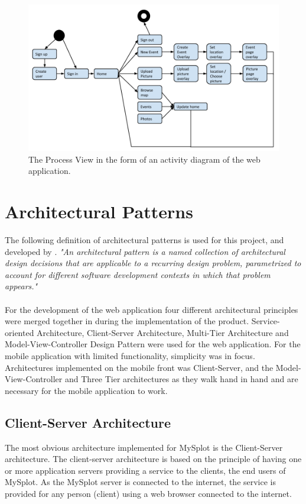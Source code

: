 \begin{figure}
\centering
\includegraphics[width=\linewidth]{./Architecture/img/ProcessView.png}
\caption{The Process View in the form of an activity diagram of the web application. \label{overflow}}
\end{figure}


\section{Architectural Patterns}
\label{sec:ArchPatterns}
The following definition of architectural patterns is used for this project, and developed by \cite{taylor2009software}.
\bigskip
\emph{"An architectural pattern is a named collection of architectural design decisions that are applicable to a recurring design problem, parametrized to account for different software development contexts in which that problem appears."}

\paragraph{} For the development of the web application four different architectural principles were merged together in during the implementation of the product. Service-oriented Architecture, Client-Server Architecture, Multi-Tier Architecture and Model-View-Controller Design Pattern were used for the web application. For the mobile application with limited functionality, simplicity was in focus. Architectures implemented on the mobile front was Client-Server, and the Model-View-Controller and Three Tier architectures as they walk hand in hand and are necessary for the mobile application to work. 

\subsection{Client-Server Architecture} 
The most obvious architecture implemented for MySplot is the Client-Server architecture. The client-server architecture is based on the principle of having one or more application servers providing a service to the clients, the end users of MySplot. As the MySplot server is connected to the internet, the service is provided for any person (client) using a web browser connected to the internet.

